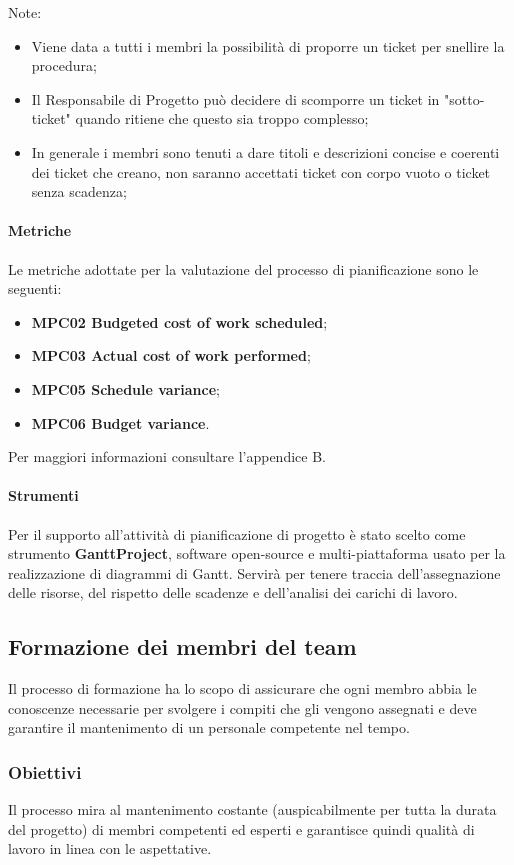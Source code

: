 Note:
\begin{itemize}
\item Viene data a tutti i membri la possibilità di proporre un ticket per snellire la procedura;
\item Il Responsabile di Progetto può decidere di scomporre un ticket in "sotto-ticket" quando ritiene che questo sia troppo complesso;
\item In generale i membri sono tenuti a dare titoli e descrizioni concise e coerenti dei ticket che creano, non saranno accettati ticket con corpo vuoto o ticket senza scadenza;
\end{itemize}

\paragraph{Metriche}
Le metriche adottate per la valutazione del processo di pianificazione sono le seguenti:
\begin{itemize}
\item \textbf{MPC02 Budgeted cost of work scheduled};
\item \textbf{MPC03 Actual cost of work performed};
\item \textbf{MPC05 Schedule variance};
\item \textbf{MPC06 Budget variance}.
\end{itemize} 
Per maggiori informazioni consultare l'appendice B.

\paragraph{Strumenti}
Per il supporto all’attività di pianificazione di progetto è stato scelto come strumento
\textbf{GanttProject}, software open-source e multi-piattaforma usato per la realizzazione di diagrammi di Gantt. Servirà per tenere traccia dell'assegnazione delle risorse, del rispetto delle scadenze e dell'analisi dei carichi di lavoro.


\subsection{Formazione dei membri del team}
Il processo di formazione ha lo scopo di assicurare che ogni membro abbia le conoscenze necessarie per svolgere i compiti che gli vengono assegnati e deve garantire il mantenimento di un personale competente nel tempo.

\subsubsection{Obiettivi}
Il processo mira al mantenimento costante (auspicabilmente per tutta la durata del progetto) di membri competenti ed esperti e garantisce quindi qualità di lavoro in linea con le aspettative.

